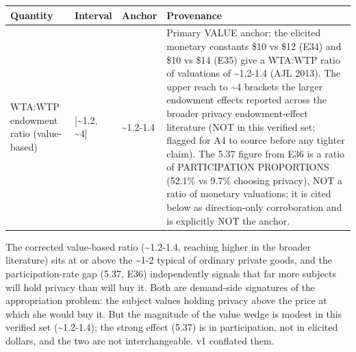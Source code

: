 \documentclass[
  11pt,
]{article}
\newcounter{none} %
\begin{document}
{\def\LTcaptype{none} %
\begin{longtable}[]{@{}
  >{\raggedright\arraybackslash}p{}
  >{\raggedright\arraybackslash}p{}
  >{\raggedright\arraybackslash}p{}
  >{\raggedright\arraybackslash}p{}@{}}
\toprule\noalign{}
\begin{minipage}[b]{\linewidth}\raggedright
Quantity
\end{minipage} & \begin{minipage}[b]{\linewidth}\raggedright
Interval
\end{minipage} & \begin{minipage}[b]{\linewidth}\raggedright
Anchor
\end{minipage} & \begin{minipage}[b]{\linewidth}\raggedright
Provenance
\end{minipage} \\
\midrule\noalign{}
\endhead
\bottomrule\noalign{}
\endlastfoot
WTA:WTP endowment ratio (value-based) & {[}\textasciitilde1.2,
\textasciitilde4{]} & \textasciitilde1.2-1.4 & Primary VALUE anchor: the
elicited monetary constants \$10 vs \$12 (E34) and \$10 vs \$14 (E35)
give a WTA:WTP ratio of valuations of \textasciitilde1.2-1.4 (AJL 2013).
The upper reach to \textasciitilde4 brackets the larger endowment
effects reported across the broader privacy endowment-effect literature
(NOT in this verified set; flagged for A4 to source before any tighter
claim). The 5.37 figure from E36 is a ratio of PARTICIPATION PROPORTIONS
(52.1\% vs 9.7\% choosing privacy), NOT a ratio of monetary valuations;
it is cited below as direction-only corroboration and is explicitly NOT
the anchor. \\
\end{longtable}
}

The corrected value-based ratio (\textasciitilde1.2-1.4, reaching higher
in the broader literature) sits at or above the \textasciitilde1-2
typical of ordinary private goods, and the participation-rate gap (5.37,
E36) independently signals that far more subjects will hold privacy than
will buy it. Both are demand-side signatures of the appropriation
problem: the subject values holding privacy above the price at which she
would buy it. But the magnitude of the value wedge is modest in this
verified set (\textasciitilde1.2-1.4); the strong effect (5.37) is in
participation, not in elicited dollars, and the two are not
interchangeable. v1 conflated them.
\end{document}
